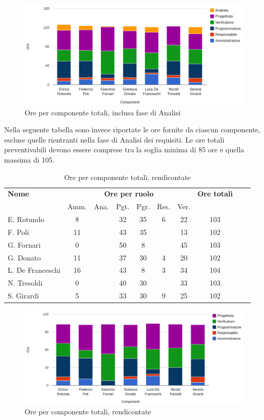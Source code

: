 \begin{figure}[H]
\centering
\includegraphics[scale=0.35]{4-5-1.png}
\caption{Ore per componente totali, inclusa fase di Analisi\label{fig:nome}}
\end{figure}

Nella seguente tabella sono invece riportate le ore fornite da ciascun componente, escluse quelle rientranti nella fase di Analisi dei requisiti. 
Le ore totali preventivabili devono essere comprese tra la soglia minima di 85 ore e quella massima di 105.

\begin{table}[H]
\centering
\begin{tabular}{lccccccccc}
\toprule 
    \textbf{Nome}  & \multicolumn{6}{c}{\textbf{Ore per ruolo}} & \textbf{Ore totali}\\
     & Amm. & Ana. & Pgt. & Pgr. & Res. & Ver. \\
    \midrule
    E. Rotundo   	& 8 & & 32 & 35 & 6 & 22 & 103 \\
    F. Poli  		& 11	& & 43 & 35 &   & 13 & 102 \\
    G. Fornari		& 0	& & 50 & 8  &   & 45 & 103 \\
    G. Donato 		& 11	& & 37 & 30 & 4 & 20 & 102 \\
    L. De Franceschi 	& 16	& & 43 & 8  & 3 & 34 & 104 \\
    N. Tresoldi 		& 0	& & 40 & 30 &   & 33 & 103 \\
    S. Girardi 		& 5	& & 33 & 30 & 9 & 25 & 102 \\
    
    \bottomrule
\end{tabular}
\caption{Ore per componente totali, rendicontate}
\end{table}

\begin{figure}[H]
\centering
\includegraphics[scale=0.35]{4-5-2.png}
\caption{Ore per componente totali, rendicontate\label{fig:nome}}
\end{figure}